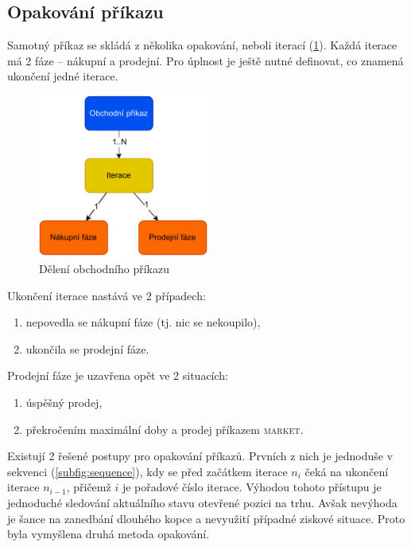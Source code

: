 \subsection{Opakování příkazu}
Samotný příkaz se skládá z několika opakování, neboli iterací (\ref{fig:trade-order-parts}). Každá iterace má 2 fáze -- nákupní a prodejní. Pro úplnost je ještě nutné definovat, co znamená ukončení jedné iterace.
\begin{figure}[ht]
    \centering
    \includegraphics[width=0.5\textwidth]{Figures/trade-order-parts.pdf}
    \caption{Dělení obchodního příkazu}
    \label{fig:trade-order-parts}
\end{figure}
Ukončení iterace nastává ve 2 případech:
\begin{enumerate}
    \item nepovedla se nákupní fáze (tj. nic se nekoupilo),
    \item ukončila se prodejní fáze.
\end{enumerate}
Prodejní fáze je uzavřena opět ve 2 situacích:
\begin{enumerate}
    \item úspěšný prodej,
    \item překročením maximální doby a prodej příkazem \textsc{market}.
\end{enumerate}

Existují 2 řešené postupy pro opakování příkazů. Prvních z nich je jednoduše v sekvenci (\ref{subfig:sequence}), kdy se před začátkem iterace $n_i$ čeká na ukončení iterace $n_{i - 1}$, přičemž $i$ je pořadové
číslo iterace. Výhodou tohoto přístupu je jednoduché sledování aktuálního stavu otevřené pozici na trhu. Avšak nevýhoda je šance na zanedbání dlouhého kopce a nevyužití případné ziskové situace.
Proto byla vymyšlena druhá metoda opakování.

